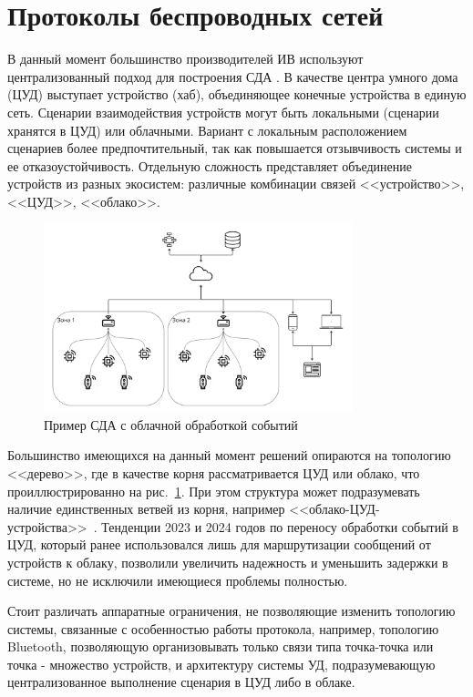 \documentclass[14pt, a4paper]{extreport}
\begin{document}
\section{Протоколы беспроводных сетей}
В данный момент большинство производителей ИВ используют централизованный подход для построения СДА \cite{Rus_alternative}. В качестве центра умного дома (ЦУД) выступает устройство
(хаб), объединяющее конечные устройства в единую сеть. Сценарии взаимодействия устройств могут быть локальными (сценарии хранятся в ЦУД) или облачными. Вариант с локальным
расположением сценариев более предпочтительный, так как повышается отзывчивость системы и ее отказоустойчивость. Отдельную сложность представляет объединение устройств из разных
экосистем: различные комбинации связей <<устройство>>, <<ЦУД>>, <<облако>>.

\begin{figure}[ht]
    \centering
    \includegraphics[width=0.8\textwidth]{images/CommertialAlternativeDesign.png}
    \caption{Пример СДА с облачной обработкой событий}
    \label{fig:cloud_event_processing}
\end{figure}

Большинство имеющихся на данный момент решений опираются на топологию <<дерево>>, где в качестве корня рассматривается ЦУД или облако, что проиллюстрированно на
рис.~\ref{fig:cloud_event_processing}. При этом структура может подразумевать наличие единственных ветвей из корня, например <<облако-ЦУД-устройства>>~\cite{smart_home_review}.
Тенденции 2023 и 2024 годов по переносу обработки событий в ЦУД, который ранее использовался лишь для маршрутизации сообщений от устройств к облаку, позволили увеличить надежность
и уменьшить задержки в системе, но не исключили имеющиеся проблемы полностью.

Стоит различать аппаратные ограничения, не позволяющие изменить топологию системы, связанные с особенностью работы протокола, например, топологию Bluetooth, позволяющую организовывать
только связи типа точка-точка или точка - множество устройств, и архитектуру системы УД, подразумевающую централизованное выполнение сценария в ЦУД либо в облаке.
\end{document}
